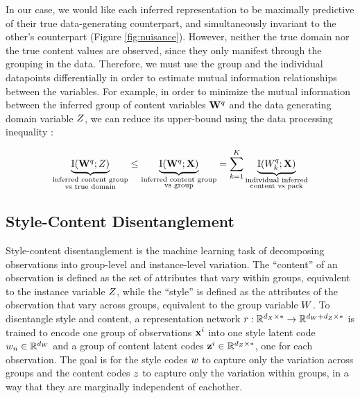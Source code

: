 \documentclass[../thesis.tex]{subfiles}
\begin{document}
In our case, we would like each inferred representation to be maximally predictive of their true data-generating counterpart, and simultaneously invariant to the other's counterpart (Figure \ref{fig:nuisance}). However, neither the true domain nor the true content values are observed, since they only manifest through the grouping in the data. Therefore, we must use the group and the individual datapoints differentially in order to estimate mutual information relationships between the variables. For example, in order to minimize the mutual information between the inferred group of content variables $\mygroup{\myrv{w}}^{q}$ and the data generating domain variable $\myrv{z}$, we can reduce its upper-bound using the data processing inequality \citep{cover1999elements}:

\begin{equation}
    \underbrace{\mathrm{I}(\mygroup{\myrv{w}}^q; \myrv{z})}_{\substack{\text{inferred content group} \\ \text{vs true domain}}} \leq \underbrace{\mathrm{I}(\mygroup{\myrv{w}}^q; \mygroup{\myrv{x}})}_{\substack{\text{inferred content group} \\ \text{vs group}}} = \sum_{k=1}^K \underbrace{\mathrm{I}(\myrv{w}^q_k; \mygroup{\myrv{x}})}_{\substack{\text{individual inferred} \\ \text{content vs pack}}}
    \label{eq:content_bottle}
\end{equation}

\subsection{Style-Content Disentanglement}

Style-content disentanglement is the machine learning task of decomposing observations into group-level and instance-level variation. 
The ``content'' of an observation is defined as the set of attributes that vary within groups, equivalent to the instance variable $\myrv{z}$, while the ``style'' is defined as the attributes of the observation that vary across groups, equivalent to the group variable $\myrv{w}$. To disentangle style and content, a representation network $\myfunc{r}: \mathbb{R}^{\mydim{x} \times *} \to \mathbb{R}^{\mydim{w} + \mydim{z} \times *}$ is trained to encode one group of observations $\mathbf{{x}}^i$ into one style latent code $\myvect{w}_n \in \mathbb{R}^{\mydim{w}}$ and a group of content latent codes $\mygroup{\myvect{z}}^i \in \mathbb{R}^{\mydim{z} \times *}$, one for each observation. The goal is for the style codes $w$ to capture only the variation across groups and the content codes $z$ to capture only the variation within groups, in a way that they are marginally independent of eachother.
\end{document}
